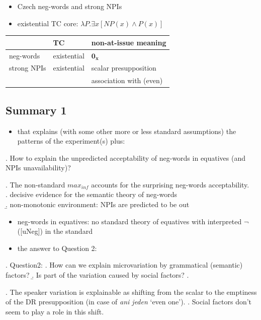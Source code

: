 \documentclass[
  letterpaper,
  DIV=11,
  numbers=noendperiod]{scrartcl}
\providecommand{\tightlist}{%
  \setlength{\itemsep}{0pt}\setlength{\parskip}{0pt}}\usepackage{longtable,booktabs,array}
\begin{document}
\begin{itemize}
\tightlist
\item
  Czech neg-words and strong NPIs
\item
  existential TC core: \(\lambda P.\exists x[NP(x) \wedge P(x)]\)
\end{itemize}

\begin{longtable}[]{@{}lll@{}}
\toprule()
& TC & non-at-issue meaning \\
\midrule()
\endhead
neg-words & existential & \(\mathbf{0_x}\) \\
strong NPIs & existential & scalar presupposition \\
& & association with (even) \\
\bottomrule()
\end{longtable}

\hypertarget{summary-1-1}{%
\subsection{Summary 1}\label{summary-1-1}}

\begin{itemize}
\tightlist
\item
  that explains (with some other more or less standard assumptions) the
  patterns of the experiment(s) plus:
\end{itemize}

\ex. How to explain the unpredicted acceptability of neg-words in
equatives (and NPIs unavailability)?

\ex. The non-standard \(max_{inf}\) accounts for the surprising
neg-words acceptability.\\
\a. decisive evidence for the semantic theory of neg-words\\
\b. non-monotonic environment: NPIs are predicted to be out

\begin{itemize}
\item
  neg-words in equatives: no standard theory of equatives with
  interpreted \(\neg\) ({[}uNeg{]}) in the standard
\item
  the answer to Question 2:
\end{itemize}

\ex. Question2: \a. How can we explain microvariation by grammatical
(semantic) factors? \b. Is part of the variation caused by social
factors? \z.

\ex. The speaker variation is explainable as shifting from the scalar to
the emptiness of the DR presupposition (in case of \emph{ani jeden}
`even one'). \a. Social factors don't seem to play a role in this shift.
\end{document}
